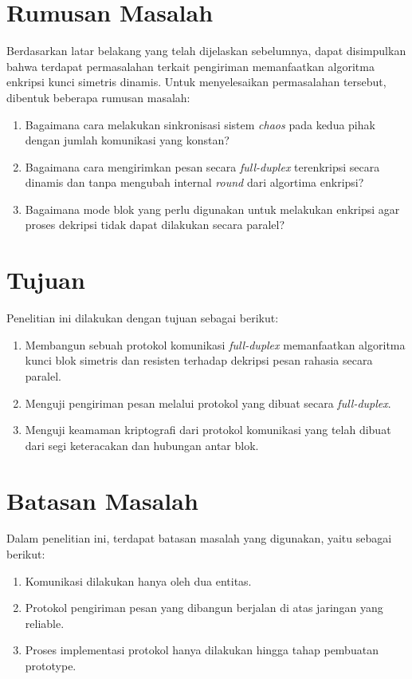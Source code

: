 \section{Rumusan Masalah}
Berdasarkan latar belakang yang telah dijelaskan sebelumnya, dapat disimpulkan bahwa terdapat permasalahan terkait pengiriman memanfaatkan algoritma enkripsi kunci simetris dinamis. Untuk menyelesaikan permasalahan tersebut, dibentuk beberapa rumusan masalah:
\begin{enumerate}
  \item Bagaimana cara melakukan sinkronisasi sistem \emph{chaos} pada kedua pihak dengan jumlah komunikasi yang konstan?
  \item Bagaimana cara mengirimkan pesan secara \emph{full-duplex} terenkripsi secara dinamis dan tanpa mengubah internal \emph{round} dari algortima enkripsi?
  \item Bagaimana mode blok yang perlu digunakan untuk melakukan enkripsi agar proses dekripsi tidak dapat dilakukan secara paralel?
\end{enumerate}

\section{Tujuan}
Penelitian ini dilakukan dengan tujuan sebagai berikut:

\begin{enumerate}
  \item Membangun sebuah protokol komunikasi \emph{full-duplex} memanfaatkan algoritma kunci blok simetris dan resisten terhadap dekripsi pesan rahasia secara paralel.
  \item Menguji pengiriman pesan melalui protokol yang dibuat secara \emph{full-duplex}.
  \item Menguji keamaman kriptografi dari protokol komunikasi yang telah dibuat dari segi keteracakan dan hubungan antar blok.
\end{enumerate}

\section{Batasan Masalah}
Dalam penelitian ini, terdapat batasan masalah yang digunakan, yaitu sebagai berikut:
\begin{enumerate}
  \item Komunikasi dilakukan hanya oleh dua entitas.
  \item Protokol pengiriman pesan yang dibangun berjalan di atas jaringan yang reliable.
  \item Proses implementasi protokol hanya dilakukan hingga tahap pembuatan prototype.
\end{enumerate}

